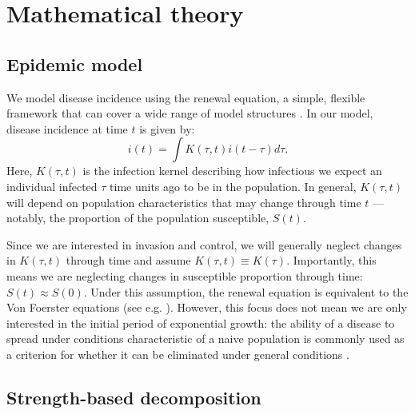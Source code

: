 \documentclass[12pt]{article}
\begin{document}
\section{Mathematical theory}

\subsection{Epidemic model}

We model disease incidence using the renewal equation, a simple, flexible framework that can cover a wide range of model structures \citep{heesterbeek1996concept, diekmann2000mathematical, roberts2004modelling, aldis2005integral, wallinga2007generation, roberts2007model, Champredon2018equivalence}.
In our model, disease incidence at time $t$ is given by:
\begin{equation}
i(t) = \int K(\tau, t) i(t-\tau) d\tau.
\end{equation}
Here, $K(\tau, t)$ is the infection kernel describing how infectious we expect an individual infected $\tau$ time units ago to be in the population.
In general, $K(\tau, t)$ will depend on population characteristics that may change through time $t$ --- notably, the proportion of the population susceptible, $S(t)$.

Since we are interested in invasion and control, we will generally neglect changes in $K(\tau, t)$ through time and assume $K(\tau, t) \equiv K(\tau)$.
Importantly, this means we are neglecting changes in susceptible proportion through time: $S(t) \approx S(0)$.
Under this assumption, the renewal equation is equivalent to the Von Foerster equations (see e.g. \cite{fraser2004factors}).
However, this focus does not mean we are only interested in the initial period of exponential growth: the ability of a disease to spread under conditions characteristic of a naive population is commonly used as a criterion for whether it can be eliminated under general conditions \citep{anderson1985vaccination,fraser2004factors}.

\subsection{Strength-based decomposition}
\end{document}
